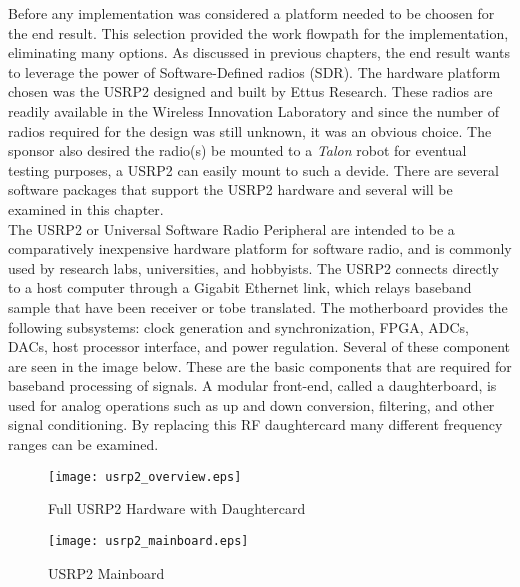 Before any implementation was considered a platform needed to be choosen for the end result.  This selection provided the work flowpath for the implementation, eliminating many options.  As discussed in previous chapters, the end result wants to leverage the power of Software-Defined radios (SDR).  The hardware platform chosen was the USRP2 designed and built by Ettus Research\cite{USRP2Stats}.  These radios are readily available in the Wireless Innovation Laboratory and since the number of radios required for the design was still unknown, it was an obvious choice.  The sponsor also desired the radio(s) be mounted to a \textit{Talon} robot for eventual testing purposes, a USRP2 can easily mount to such a devide.  There are several software packages that support the USRP2 hardware and several will be examined in this chapter.\\

The USRP2 or Universal Software Radio Peripheral are intended to be a comparatively inexpensive hardware platform for software radio, and is commonly used by research labs, universities, and hobbyists\cite{wired}.  The USRP2 connects directly to a host computer through a Gigabit Ethernet link, which relays baseband sample that have been receiver or tobe translated.   The motherboard provides the following subsystems: clock generation and synchronization, FPGA, ADCs, DACs, host processor interface, and power regulation. Several of these component are seen in the image below.  These are the basic components that are required for baseband processing of signals. A modular front-end, called a daughterboard, is used for analog operations such as up and down conversion, filtering, and other signal conditioning. By replacing this RF daughtercard many different frequency ranges can be examined.\\

\begin{figure}\label{usrp2_full_hardware}
\centering
\texttt{[image: usrp2\_overview.eps]}
\caption{Full USRP2 Hardware with Daughtercard}
\end{figure}

\begin{figure}\label{usrp2_mainboard}
\centering
\texttt{[image: usrp2\_mainboard.eps]}
\caption{USRP2 Mainboard}
\end{figure}


